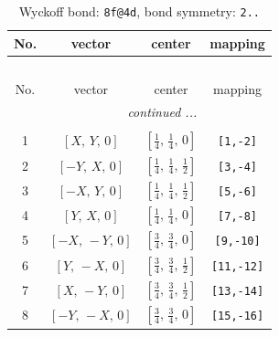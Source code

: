 \documentclass[fleqn,8pt]{jsarticle}
\begin{document}
\begin{longtable}{cccc}
\caption{Wyckoff bond: {\tt 8f@4d}, bond symmetry: {\tt 2..}}
 \\
 \hline \hline
No. & vector & center & mapping \\ \hline \endfirsthead

\multicolumn{3}{l}{\tablename\ \thetable{}} \\
 \hline \hline
No. & vector & center & mapping \\ \hline \endhead

 \hline \hline
\multicolumn{3}{r}{\footnotesize\it continued ...} \\ \endfoot

 \hline \hline
\multicolumn{3}{r}{} \\ \endlastfoot

1 & $\left[ X,\, Y,\, 0 \right]$ & $\left[ \frac{1}{4},\, \frac{1}{4},\, 0 \right]$ & {\tt [1,-2]} \\ \hline
2 & $\left[ - Y,\, X,\, 0 \right]$ & $\left[ \frac{1}{4},\, \frac{1}{4},\, \frac{1}{2} \right]$ & {\tt [3,-4]} \\ \hline
3 & $\left[ - X,\, Y,\, 0 \right]$ & $\left[ \frac{1}{4},\, \frac{1}{4},\, \frac{1}{2} \right]$ & {\tt [5,-6]} \\ \hline
4 & $\left[ Y,\, X,\, 0 \right]$ & $\left[ \frac{1}{4},\, \frac{1}{4},\, 0 \right]$ & {\tt [7,-8]} \\ \hline
5 & $\left[ - X,\, - Y,\, 0 \right]$ & $\left[ \frac{3}{4},\, \frac{3}{4},\, 0 \right]$ & {\tt [9,-10]} \\ \hline
6 & $\left[ Y,\, - X,\, 0 \right]$ & $\left[ \frac{3}{4},\, \frac{3}{4},\, \frac{1}{2} \right]$ & {\tt [11,-12]} \\ \hline
7 & $\left[ X,\, - Y,\, 0 \right]$ & $\left[ \frac{3}{4},\, \frac{3}{4},\, \frac{1}{2} \right]$ & {\tt [13,-14]} \\ \hline
8 & $\left[ - Y,\, - X,\, 0 \right]$ & $\left[ \frac{3}{4},\, \frac{3}{4},\, 0 \right]$ & {\tt [15,-16]} \\
\end{longtable}
\renewcommand{\arraystretch}{1.2}
\end{document}
